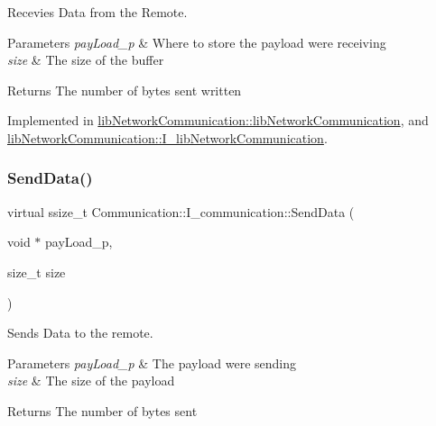 Recevies Data from the Remote. 


\begin{DoxyParams}{Parameters}
{\em pay\+Load\+\_\+p} & Where to store the payload we\textquotesingle{}re receiving \\
\hline
{\em size} & The size of the buffer \\
\hline
\end{DoxyParams}
\begin{DoxyReturn}{Returns}
The number of bytes sent written 
\end{DoxyReturn}


Implemented in \mbox{\hyperlink{classlibNetworkCommunication_1_1libNetworkCommunication_adbe327ebbc37c81231c3f9843300c778}{lib\+Network\+Communication\+::lib\+Network\+Communication}}, and \mbox{\hyperlink{classlibNetworkCommunication_1_1I__libNetworkCommunication_ad8c03e24047f105a93549443c2ec2c92}{lib\+Network\+Communication\+::\+I\+\_\+lib\+Network\+Communication}}.

\mbox{\label{classCommunication_1_1I__communication_ad25474a90b1bf2789e9ab6ff57b3406e}} 
\subsubsection{\texorpdfstring{SendData()}{SendData()}}
{\footnotesize\ttfamily virtual ssize\+\_\+t Communication\+::\+I\+\_\+communication\+::\+Send\+Data (\begin{DoxyParamCaption}\item[{void $\ast$}]{pay\+Load\+\_\+p,  }\item[{size\+\_\+t}]{size }\end{DoxyParamCaption})\hspace{0.3cm}{\ttfamily [pure virtual]}}



Sends Data to the remote. 


\begin{DoxyParams}{Parameters}
{\em pay\+Load\+\_\+p} & The payload we\textquotesingle{}re sending \\
\hline
{\em size} & The size of the payload \\
\hline
\end{DoxyParams}
\begin{DoxyReturn}{Returns}
The number of bytes sent 
\end{DoxyReturn}


